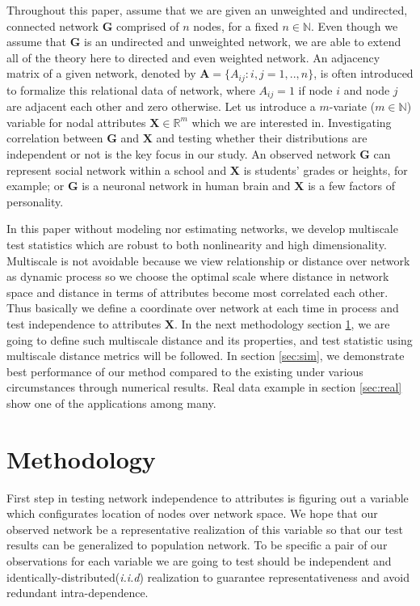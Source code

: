\documentclass[12pt]{article}
\theoremstyle{definition}
\begin{document}
	Throughout this paper, assume that we are given an unweighted and undirected, connected network $\boldsymbol{G}$ comprised of $n$ nodes, for a fixed $n \in \mathbb{N}$. Even though we assume that $\boldsymbol{G}$ is an undirected and unweighted network, we are able to extend all of the theory here to directed and even weighted network. An adjacency matrix of a given network, denoted by $\boldsymbol{A} = \{A_{ij} : i,j= 1,..,n \}$, is often introduced to formalize this relational data of network, where $A_{ij} = 1$ if node $i$ and node $j$ are adjacent each other and zero otherwise. Let us introduce a $m$-variate ($m \in \mathbb{N}$) variable for nodal attributes $\boldsymbol{X}  \in \mathbb{R}^{m}$ which we are interested in. Investigating correlation between $\boldsymbol{G}$ and $\boldsymbol{X}$ and testing whether their distributions are independent or not is the key focus in our study. An observed network $\mathbf{G}$ can represent social network within a school and $\boldsymbol{X}$ is students' grades or heights, for example; or $\mathbf{G}$ is a neuronal network in human brain and $\boldsymbol{X}$ is a few factors of personality. 
	
	In this paper without modeling nor estimating networks, we develop multiscale test statistics which are robust to both nonlinearity and high dimensionality. Multiscale is not avoidable because we view relationship or distance over network as dynamic process so we choose the optimal scale where distance in network space and distance in terms of attributes become most correlated each other. Thus basically we define a coordinate over network at each time in process and test independence to attributes $\mathbf{X}$. In the next methodology section \ref{sec:method}, we are going to define such multiscale distance and its properties, and test statistic using multiscale distance metrics will be followed. In section \ref{sec:sim}, we demonstrate best performance of our method compared to the existing under various circumstances through numerical results. Real data example in section \ref{sec:real} show one of the applications among many.  
	
	
	\bigskip
	\section{Methodology}
	\label{sec:method}
	
First step in testing network independence to attributes is figuring out a variable which configurates location of nodes over network space. We hope that our observed network be a representative realization of this variable so that our test results can be generalized to population network. To be specific a pair of our observations for each variable we are going to test should be independent and identically-distributed(\textit{i.i.d}) realization to guarantee representativeness and avoid redundant intra-dependence.  
	
\end{document}

